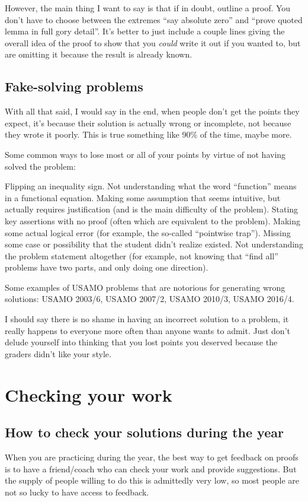 However, the main thing I want to say is that
\alert{if in doubt, outline a proof}.
You don't have to choose between the extremes
``say absolute zero'' and ``prove quoted lemma in full gory detail''.
It's better to just include a couple lines giving the overall idea of the proof
to show that you \emph{could} write it out if you wanted to,
but are omitting it because the result is already known.


\subsection{Fake-solving problems}
With all that said, I would say in the end,
when \alert{people don't get the points they expect,
it's because their solution is actually wrong or incomplete},
not because they wrote it poorly.
This is true something like 90\% of the time, maybe more.

Some common ways to lose most or all of your points
by virtue of not having solved the problem:
\begin{itemize}
	\ii Flipping an inequality sign.
	\ii Not understanding what the word ``function'' means
	in a functional equation.
	\ii Making some assumption that seems intuitive,
	but actually requires justification (and is the main difficulty of the problem).
	\ii Stating key assertions with no proof
	(often which are equivalent to the problem).
	\ii Making some actual logical error
	(for example, the so-called ``pointwise trap'').
	\ii Missing some case or possibility that the student didn't realize existed.
	\ii Not understanding the problem statement altogether
	(for example, not knowing that ``find all'' problems have two parts,
	and only doing one direction).
\end{itemize}
Some examples of USAMO problems that are notorious for generating wrong solutions:
USAMO 2003/6, USAMO 2007/2, USAMO 2010/3, USAMO 2016/4.

I should say there is no shame in having an incorrect solution to a problem,
it really happens to everyone more often than anyone wants to admit.
Just don't delude yourself into thinking that you lost points
you deserved because the graders didn't like your style.

\pagebreak

\section{Checking your work}
\subsection{How to check your solutions during the year}
When you are practicing during the year,
the best way to get feedback on proofs is to have a friend/coach
who can check your work and provide suggestions.
But the supply of people willing to do this is admittedly very low,
so most people are not so lucky to have access to feedback.

